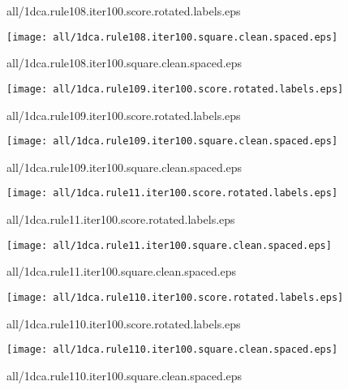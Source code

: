 \documentclass{article}
\begin{document}
{\footnotesize all/1dca.rule108.iter100.score.rotated.labels.eps}
\begin{center}
\begin{minipage}{\textwidth}
\texttt{[image: all/1dca.rule108.iter100.square.clean.spaced.eps]}
\end{minipage}
\end{center}
{\footnotesize all/1dca.rule108.iter100.square.clean.spaced.eps}
\begin{center}
\begin{minipage}{\textwidth}
\texttt{[image: all/1dca.rule109.iter100.score.rotated.labels.eps]}
\end{minipage}
\end{center}
{\footnotesize all/1dca.rule109.iter100.score.rotated.labels.eps}
\begin{center}
\begin{minipage}{\textwidth}
\texttt{[image: all/1dca.rule109.iter100.square.clean.spaced.eps]}
\end{minipage}
\end{center}
{\footnotesize all/1dca.rule109.iter100.square.clean.spaced.eps}
\begin{center}
\begin{minipage}{\textwidth}
\texttt{[image: all/1dca.rule11.iter100.score.rotated.labels.eps]}
\end{minipage}
\end{center}
{\footnotesize all/1dca.rule11.iter100.score.rotated.labels.eps}
\begin{center}
\begin{minipage}{\textwidth}
\texttt{[image: all/1dca.rule11.iter100.square.clean.spaced.eps]}
\end{minipage}
\end{center}
{\footnotesize all/1dca.rule11.iter100.square.clean.spaced.eps}
\begin{center}
\begin{minipage}{\textwidth}
\texttt{[image: all/1dca.rule110.iter100.score.rotated.labels.eps]}
\end{minipage}
\end{center}
{\footnotesize all/1dca.rule110.iter100.score.rotated.labels.eps}
\begin{center}
\begin{minipage}{\textwidth}
\texttt{[image: all/1dca.rule110.iter100.square.clean.spaced.eps]}
\end{minipage}
\end{center}
{\footnotesize all/1dca.rule110.iter100.square.clean.spaced.eps}
\end{document}
